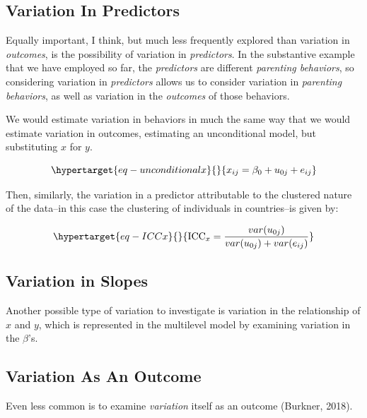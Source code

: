 \documentclass[
  letterpaper,
  DIV=11,
  numbers=noendperiod]{scrreprt}
\begin{document}
\hypertarget{variation-in-predictors}{%
\subsection{Variation In Predictors}\label{variation-in-predictors}}

Equally important, I think, but much less frequently explored than
variation in \emph{outcomes}, is the possibility of variation in
\emph{predictors}. In the substantive example that we have employed so
far, the \emph{predictors} are different \emph{parenting behaviors}, so
considering variation in \emph{predictors} allows us to consider
variation in \emph{parenting behaviors}, as well as variation in the
\emph{outcomes} of those behaviors.

We would estimate variation in behaviors in much the same way that we
would estimate variation in outcomes, estimating an unconditional model,
but substituting \(x\) for \(y\).

\begin{equation}\protect\hypertarget{eq-unconditionalx}{}{x_{ij} = \beta_0 + u_{0j} + e_{ij}}\label{eq-unconditionalx}\end{equation}

Then, similarly, the variation in a predictor attributable to the
clustered nature of the data--in this case the clustering of individuals
in countries--is given by:

\begin{equation}\protect\hypertarget{eq-ICCx}{}{\text{ICC}_x = \frac{var(u_{0j})}{var(u_{0j}) + var(e_{ij})}}\label{eq-ICCx}\end{equation}

\hypertarget{variation-in-slopes}{%
\subsection{Variation in Slopes}\label{variation-in-slopes}}

Another possible type of variation to investigate is variation in the
relationship of \(x\) and \(y\), which is represented in the multilevel
model by examining variation in the \(\beta\)'s.

\hypertarget{variation-as-an-outcome}{%
\subsection{Variation As An Outcome}\label{variation-as-an-outcome}}

Even less common is to examine \emph{variation} itself as an outcome
(Burkner, 2018).
\end{document}
